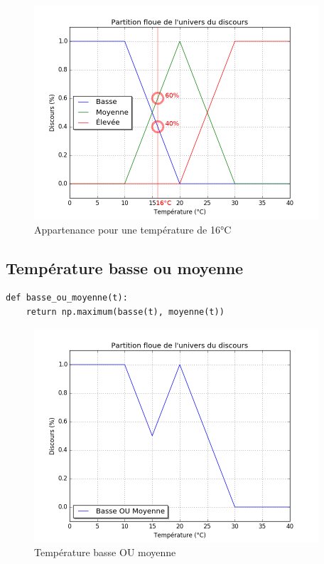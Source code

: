 \documentclass[a4paper]{article}
\begin{document}
\begin{figure}[h]
\begin{center}
	\includegraphics[width=400px]{plot_3_16dC.png}
\end{center}
\caption{Appartenance pour une température de 16°C}
\end{figure}

\subsection{Température basse ou moyenne}

\begin{lstlisting}
def basse_ou_moyenne(t):
    return np.maximum(basse(t), moyenne(t))
\end{lstlisting}

\begin{figure}[h]
\begin{center}
	\includegraphics[width=400px]{plot_basse_ou_moyenne.png}
\end{center}
\caption{Température basse OU moyenne}
\end{figure}
\end{document}
